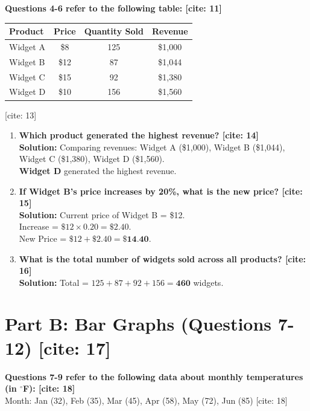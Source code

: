 \documentclass[11pt]{article}
\begin{document}
\vspace{0.5cm}
\noindent \textbf{Questions 4-6 refer to the following table: [cite: 11]}

\begin{table}[h]
\centering
\begin{tabular}{lccc}
\toprule
\textbf{Product} & \textbf{Price} & \textbf{Quantity Sold} & \textbf{Revenue} \\ \midrule
Widget A & \$8 & 125 & \$1,000 \\
Widget B & \$12 & 87 & \$1,044 \\
Widget C & \$15 & 92 & \$1,380 \\
Widget D & \$10 & 156 & \$1,560 \\ \bottomrule
\end{tabular}
\end{table}
\vspace{0.2cm} [cite: 13]

\begin{enumerate}[resume]
    \item \textbf{Which product generated the highest revenue? [cite: 14]} \\
    \textbf{Solution:} Comparing revenues: Widget A (\$1,000), Widget B (\$1,044), Widget C (\$1,380), Widget D (\$1,560). \\
    \textbf{Widget D} generated the highest revenue.
    
    \item \textbf{If Widget B's price increases by 20\%, what is the new price? [cite: 15]} \\
    \textbf{Solution:} Current price of Widget B = \$12. \\
    Increase = $\$12 \times 0.20 = \$2.40$. \\
    New Price = $\$12 + \$2.40 = \textbf{\$14.40}$.
    
    \item \textbf{What is the total number of widgets sold across all products? [cite: 16]} \\
    \textbf{Solution:} Total = $125 + 87 + 92 + 156 = \textbf{460}$ widgets.
\end{enumerate}

\section*{Part B: Bar Graphs (Questions 7-12) [cite: 17]}

\noindent \textbf{Questions 7-9 refer to the following data about monthly temperatures (in $^\circ$F): [cite: 18]} \\
Month: Jan (32), Feb (35), Mar (45), Apr (58), May (72), Jun (85) [cite: 18]
\end{document}

